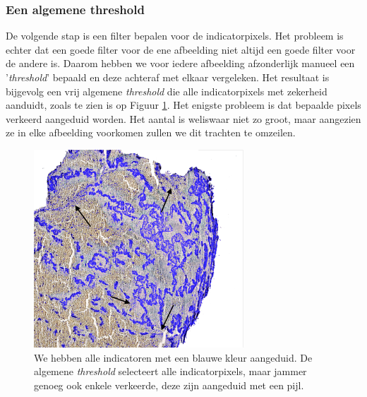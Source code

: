 \documentclass[a4paper,kulak]{kulakarticle}
\begin{document}
\subsubsection{Een algemene threshold}
De volgende stap is een filter bepalen voor de indicatorpixels. Het probleem is echter dat een goede filter voor de ene afbeelding niet altijd een goede filter voor de andere is. Daarom hebben we voor iedere afbeelding afzonderlijk manueel een '\textit{threshold}' bepaald en deze achteraf met elkaar vergeleken. Het resultaat is bijgevolg een vrij algemene \textit{threshold} die alle indicatorpixels met zekerheid aanduidt, zoals te zien is op Figuur \ref{figuur alg_tresh}. Het enigste probleem is dat bepaalde pixels verkeerd aangeduid worden. Het aantal is weliswaar niet zo groot, maar aangezien ze in elke afbeelding voorkomen zullen we dit trachten te omzeilen.
\begin{figure}[H]
	\centering
	\includegraphics[width = 0.7\textwidth]{algemene_threshold}
	
	\caption{We hebben alle indicatoren met een blauwe kleur aangeduid. De algemene \textit{threshold} selecteert alle indicatorpixels, maar jammer genoeg ook enkele verkeerde, deze zijn aangeduid met een pijl.}
	\label{figuur alg_tresh}
\end{figure}
\end{document}
